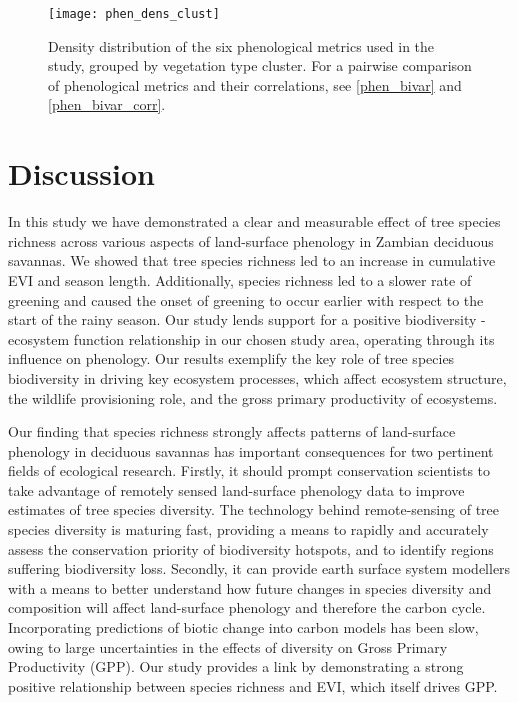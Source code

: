 \documentclass[11pt,a4paper]{article}
\begin{document}
\begin{figure}[H]
\centering
	\texttt{[image: phen\_dens\_clust]}
	\caption{Density distribution of the six phenological metrics used in the study, grouped by vegetation type cluster. For a pairwise comparison of phenological metrics and their correlations, see \autoref{phen_bivar} and \autoref{phen_bivar_corr}.}
	\label{phen_dens_clust}
\end{figure}

\section{Discussion}

In this study we have demonstrated a clear and measurable effect of tree species richness across various aspects of land-surface phenology in Zambian deciduous savannas. We showed that tree species richness led to an increase in cumulative EVI and season length. Additionally, species richness led to a slower rate of greening and caused the onset of greening to occur earlier with respect to the start of the rainy season. Our study lends support for a positive biodiversity - ecosystem function relationship in our chosen study area, operating through its influence on phenology. Our results exemplify the key role of tree species biodiversity in driving key ecosystem processes, which affect ecosystem structure, the wildlife provisioning role, and the gross primary productivity of ecosystems.

Our finding that species richness strongly affects patterns of land-surface phenology in deciduous savannas has important consequences for two pertinent fields of ecological research. Firstly, it should prompt conservation scientists to take advantage of remotely sensed land-surface phenology data to improve estimates of tree species diversity. The technology behind remote-sensing of tree species diversity is maturing fast, providing a means to rapidly and accurately assess the conservation priority of biodiversity hotspots, and to identify regions suffering biodiversity loss. Secondly, it can provide earth surface system modellers with a means to better understand how future changes in species diversity and composition will affect land-surface phenology and therefore the carbon cycle. Incorporating predictions of biotic change into carbon models has been slow, owing to large uncertainties in the effects of diversity on Gross Primary Productivity (GPP). Our study provides a link by demonstrating a strong positive relationship between species richness and EVI, which itself drives GPP.
\end{document}
